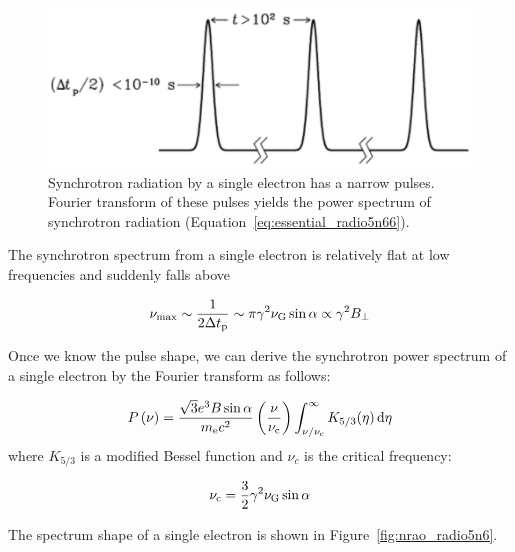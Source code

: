 \begin{figure}[htbp]
	\centering
	\includegraphics[width=.7\linewidth]{Chapter_2/Figures/NRAO_radio5n5.png}
    \caption[Synchrotron pulse by a single electron]{\label{fig:nrao_radio5n5}
        Synchrotron radiation by a single electron has a narrow pulses.
        Fourier transform of these pulses yields the power spectrum of synchrotron radiation (Equation~\ref{eq:essential_radio5n66}).
    }
\end{figure}


The synchrotron spectrum from a single electron is relatively flat at low frequencies and suddenly falls above

\begin{equation}\label{eq:essential_radio5n65}
    \nu_{\max} \sim \frac{1}{2 \Delta t_{\mathrm{p}}} \sim \pi \gamma^2 \nu_{\mathrm{G}} \sin \alpha \propto \gamma^2 B_{\perp}
\end{equation}

Once we know the pulse shape, we can derive the synchrotron power spectrum of a single electron by the Fourier transform as follows:

\begin{equation}\label{eq:essential_radio5n66}
    P\left(\nu\right) = \frac{\sqrt{3} e^3 B \sin \alpha}{m_{\mathrm{e}} c^2}\left(\frac{\nu}{\nu_{\mathrm{c}}}\right) \int_{\nu / \nu_{\mathrm{c}}}^{\infty} K_{5/3}(\eta)\,\mathrm{d}\eta
\end{equation}
 where $K_{5/3}$ is a modified Bessel function and $\nu_c$ is the critical frequency:

\begin{equation}\label{eq:essential_radio5n67}
    \nu_{\mathrm{c}} = \frac{3}{2} \gamma^2 \nu_{\mathrm{G}} \sin \alpha
\end{equation}

The spectrum shape of a single electron is shown in Figure~\ref{fig:nrao_radio5n6}.

